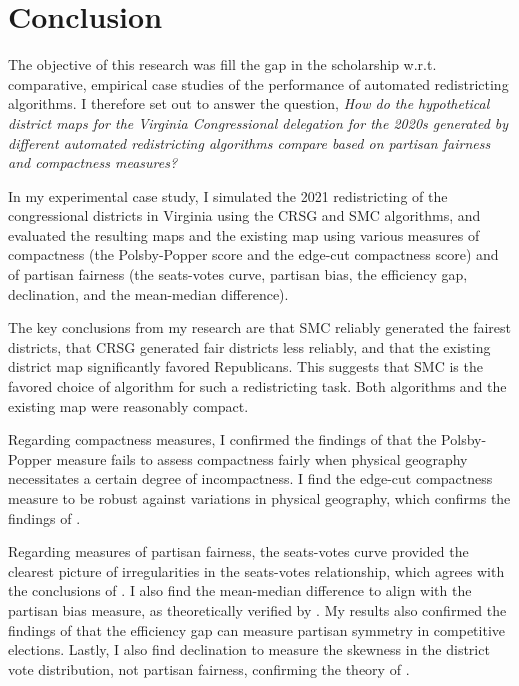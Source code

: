 \section{Conclusion}
\label{sec:conc}

The objective of this research was fill the gap in the scholarship w.r.t. comparative, empirical case studies of the performance of automated redistricting algorithms. I therefore set out to answer the question, \emph{How do the hypothetical district maps for the Virginia Congressional delegation for the 2020s generated by different automated redistricting algorithms compare based on partisan fairness and compactness measures?}

In my experimental case study, I simulated the 2021 redistricting of the congressional districts in Virginia using the CRSG and SMC algorithms, and evaluated the resulting maps and the existing map using various measures of compactness (the Polsby-Popper score and the edge-cut compactness score) and of partisan fairness (the seats-votes curve, partisan bias, the efficiency gap, declination, and the mean-median difference). 

The key conclusions from my research are that SMC reliably generated the fairest districts, that CRSG generated fair districts less reliably, and that the existing district map significantly favored Republicans. This suggests that SMC is the favored choice of algorithm for such a redistricting task. Both algorithms and the existing map were reasonably compact.

Regarding compactness measures, I confirmed the findings of \textcite{mccartan2020} that the Polsby-Popper measure fails to assess compactness fairly when physical geography necessitates a certain degree of incompactness. I find the edge-cut compactness measure to be robust against variations in physical geography, which confirms the findings of \textcite{dube2016}.

Regarding measures of partisan fairness, the seats-votes curve provided the clearest picture of irregularities in the seats-votes relationship, which agrees with the conclusions of \textcite{katz2020}. I also find the mean-median difference to align with the partisan bias measure, as theoretically verified by \textcite{katz2020}. My results also confirmed the findings of \textcite{veomett2018} that the efficiency gap can measure partisan symmetry in competitive elections. Lastly, I also find declination to measure the skewness in the district vote distribution, not partisan fairness, confirming the theory of \textcite{katz2020}. 

